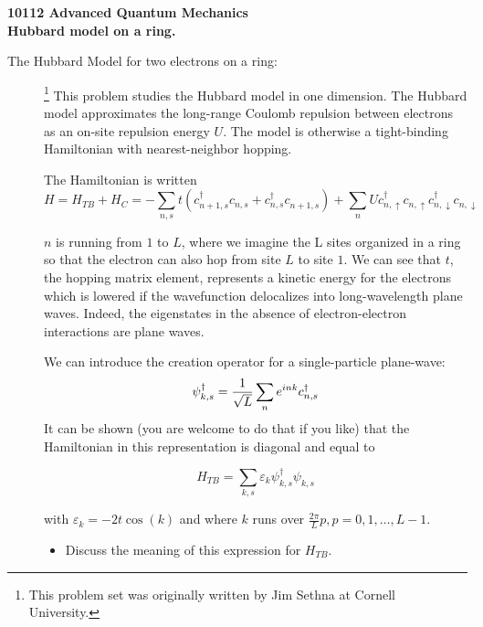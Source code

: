 \documentclass[a4paper,12pt]{article}
\begin{document}
\begin{center}
{\Large\bf 10112 Advanced Quantum Mechanics}
\vspace{.5cm}\\
{\large\bf Hubbard model on a ring.}
\end{center}

\def\pd{{\phantom\ldagger}}
\def\bra#1{\langle\,#1\,\vert}
\def\ket#1{\vert\,#1\,\rangle}
\def\ldagger{{\dagger}}

\begin{description}

\item[The Hubbard Model for two electrons on a ring:]\footnote{This problem set was originally written by Jim Sethna at Cornell
University.}
This problem studies the Hubbard model in one dimension.
The Hubbard model approximates the long-range Coulomb repulsion between 
electrons as an on-site repulsion energy $U.$  The model is otherwise
a tight-binding Hamiltonian with nearest-neighbor hopping.

The Hamiltonian is written
\begin{equation}
  \label{eq:2}
H=H_{TB}+H_C=-\sum_{n,s}t(c^\ldagger_{n+1,s}c^\pd_{n,s}
	  	      + c^\ldagger_{n,s}c^\pd_{n+1,s}) +
\sum_{n} U c^\ldagger_{n,\uparrow}c^\pd_{n,\uparrow}
	c^\ldagger_{n,\downarrow}c^\pd_{n,\downarrow}
  \end{equation}

$n$ is running from $1$ to $L$, where we imagine the L sites organized in
a ring so that the electron can also hop from site $L$ to site $1$.
We can see that $t$, the hopping matrix element, represents a kinetic 
energy for the electrons which is lowered if the wavefunction delocalizes
into long-wavelength plane waves.  Indeed, the eigenstates in the absence
of electron-electron interactions are plane waves.

We can introduce the creation operator for a single-particle plane-wave:
\begin{equation}
\psi^\ldagger_{k,s} = {1\over\sqrt{L}}\sum_n
e^{ink}c^\ldagger_{n,s}
\end{equation}
It can be shown (you are welcome to do that if you like) that the
Hamiltonian in this representation is diagonal and equal to

$$H_{TB}=\sum_{k,s}\varepsilon_k \psi^\ldagger_{k,s}\psi_{k,s}$$

with $\varepsilon_k = - 2 t \cos(k)$ and where $k$ runs over
$\frac{2\pi}{L}p, p=0,1,\ldots,L-1$.

\begin{itemize}
\item Discuss the meaning of this expression for $H_{TB}$.


\end{itemize}
\end{description}
\end{document}
